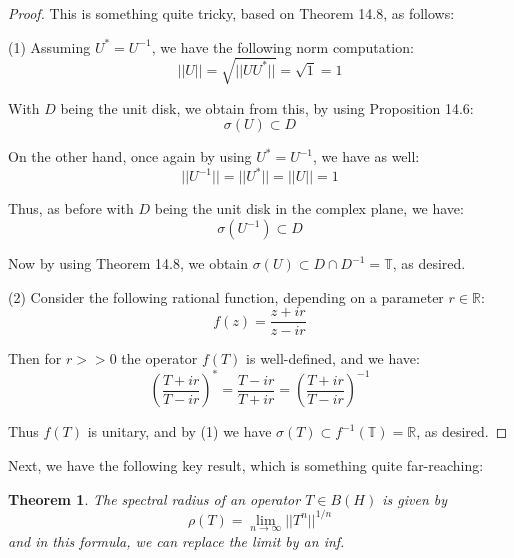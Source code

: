 \documentclass[12pt]{amsbook}
\newtheorem{theorem}{Theorem}[chapter]
\begin{document}
\begin{proof}
This is something quite tricky, based on Theorem 14.8, as follows:

\medskip

(1) Assuming $U^*=U^{-1}$, we have the following norm computation:
$$||U||
=\sqrt{||UU^*||}
=\sqrt{1}
=1$$

With $D$ being the unit disk, we obtain from this, by using Proposition 14.6:
$$\sigma(U)\subset D$$

On the other hand, once again by using $U^*=U^{-1}$, we have as well:
$$||U^{-1}||
=||U^*||
=||U||
=1$$

Thus, as before with $D$ being the unit disk in the complex plane, we have:
$$\sigma(U^{-1})\subset D$$

Now by using Theorem 14.8, we obtain $\sigma(U)
\subset D\cap D^{-1}
=\mathbb T$, as desired.

\medskip

(2) Consider the following rational function, depending on a parameter $r\in\mathbb R$:
$$f(z)=\frac{z+ir}{z-ir}$$

Then for $r>>0$ the operator $f(T)$ is well-defined, and we have:
$$\left(\frac{T+ir}{T-ir}\right)^*
=\frac{T-ir}{T+ir}
=\left(\frac{T+ir}{T-ir}\right)^{-1}$$

Thus $f(T)$ is unitary, and by (1) we have $\sigma(T)\subset f^{-1}(\mathbb T)=\mathbb R$, as desired.
\end{proof}

Next, we have the following key result, which is something quite far-reaching:

\begin{theorem}
The spectral radius of an operator $T\in B(H)$ is given by
$$\rho(T)=\lim_{n\to\infty}||T^n||^{1/n}$$
and in this formula, we can replace the limit by an inf.
\end{theorem}
\end{document}
